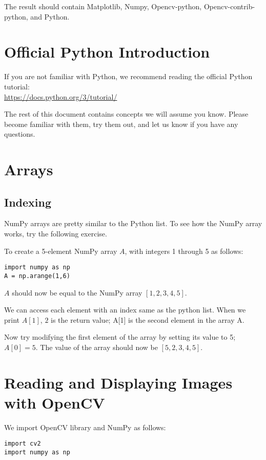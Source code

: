 \documentclass{article}
\begin{document}
The result should contain Matplotlib, Numpy, Opencv-python, Opencv-contrib-python, and Python.

\section{Official Python Introduction}

If you are not familiar with Python, we recommend reading the official Python tutorial:\\
\href{https://docs.python.org/3/tutorial/}{https://docs.python.org/3/tutorial/}

The rest of this document contains concepts we will assume you know. Please become familiar with them, try them out, and let us know if you have any questions.

\section{Arrays}

\subsection{Indexing}

NumPy arrays are pretty similar to the Python list. To see how the NumPy array works, try the following exercise.

To create a 5-element NumPy array $A$, with integers 1 through 5 as follows:

\begin{lstlisting}
import numpy as np
A = np.arange(1,6)
\end{lstlisting}

$A$ should now be equal to the NumPy array $[1,2,3,4,5]$.

We can access each element with an index same as the python list. When we print $A[1]$, $2$ is the return value; A[1] is the second element in the array A.

Now try modifying the first element of the array by setting its value to 5; $A[0]=5$. The value of the array should now be $[5,2,3,4,5]$.


\section{Reading and Displaying Images with OpenCV}

We import OpenCV library and NumPy as follows:\begin{lstlisting}
import cv2
import numpy as np
\end{lstlisting}
\end{document}
